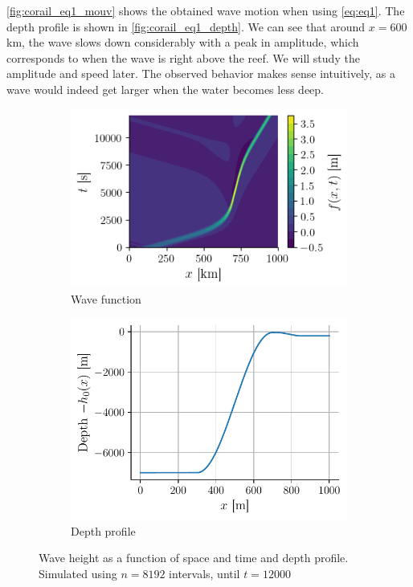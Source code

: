 \autoref{fig:corail_eq1_mouv} shows the obtained wave motion when using \autoref{eq:eq1}. The depth profile is shown in \autoref{fig:corail_eq1_depth}. We can see that around \(x=600\)km, the wave slows down considerably with a peak in amplitude, which corresponds to when the wave is right above the reef. We will study the amplitude and speed later. The observed behavior makes sense intuitively, as a wave would indeed get larger when the water becomes less deep.

\begin{figure}[h]
    \centering
    \begin{subfigure}{0.53\linewidth}
        \centering
        \includegraphics[width=\linewidth]{figures/corail_eq1_mouvement_vague.png}
        \caption{Wave function}
        \label{fig:corail_eq1_mouv}
    \end{subfigure}
    \begin{subfigure}{0.46\linewidth}
        \centering
        \includegraphics[width=\linewidth]{figures/corail_eq1_depth.pdf}
        \caption{Depth profile}
        \label{fig:corail_eq1_depth}
    \end{subfigure}
    \caption{Wave height as a function of space and time and depth profile. Simulated using \(n=8192\) intervals, until \(t=12000\)}
\end{figure}

